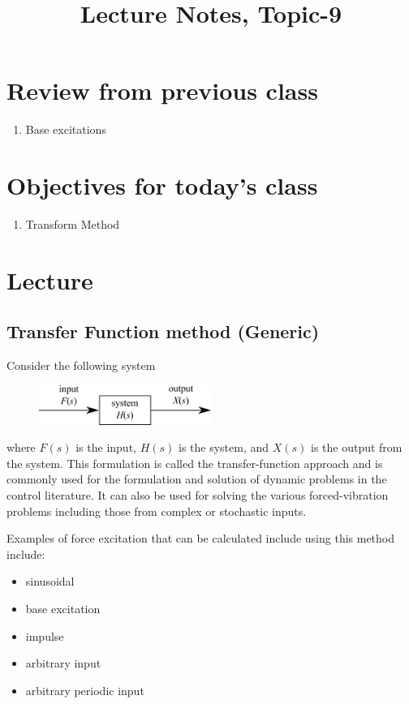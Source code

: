 \documentclass[12pt,a4paper]{article}
\begin{document}
	
	\large{}
	\title{\vspace{-2cm}Lecture Notes, Topic-9}
	\date{}
	\maketitle
	
	\section*{Review from previous class}
		\begin{enumerate}
			\item Base excitations
		\end{enumerate}
	
	\section*{Objectives for today's class}
	\begin{enumerate}
		\item  Transform Method
	\end{enumerate}
	
	\section*{Lecture}

		\subsection*{Transfer Function method (Generic)}

Consider the following system
\begin{figure}[H]
	\centering
	\includegraphics[width=0.5\textwidth]{../../Figures/system_input_output.png}
\end{figure}
where $F(s)$ is the input, $H(s)$ is the system, and $X(s)$ is the output from the system. This formulation is called the transfer-function approach and is commonly used for the formulation and solution of dynamic problems in the control literature. It can also be used for solving the various forced-vibration problems including those from complex or stochastic inputs. 

Examples of force excitation that can be calculated include using this method include:
\begin{itemize}
	\item sinusoidal
	\item base excitation
	\item impulse
	\item arbitrary input
	\item arbitrary periodic input
\end{itemize}
\end{document}
